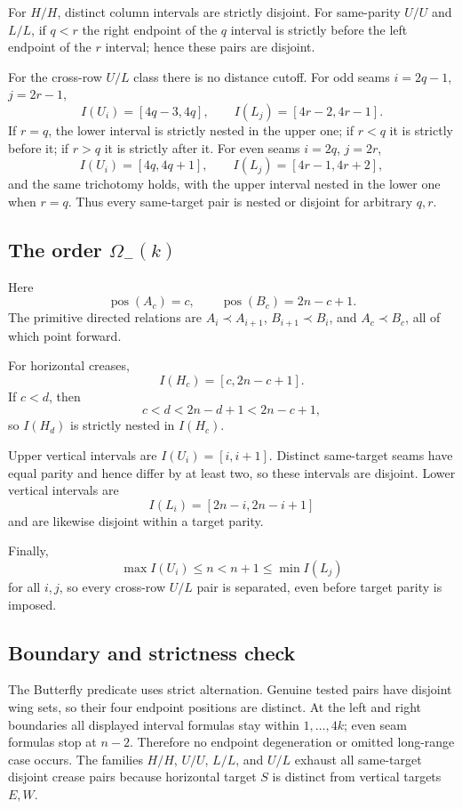 \documentclass[11pt]{article}
\theoremstyle{definition}
\theoremstyle{remark}
\begin{document}
For \(H/H\), distinct column intervals are strictly disjoint. For
same-parity \(U/U\) and \(L/L\), if \(q<r\) the right endpoint of the
\(q\) interval is strictly before the left endpoint of the \(r\)
interval; hence these pairs are disjoint.

For the cross-row \(U/L\) class there is no distance cutoff. For odd
seams \(i=2q-1\), \(j=2r-1\), \[
I(U_i)=[4q-3,4q],\qquad I(L_j)=[4r-2,4r-1].
\] If \(r=q\), the lower interval is strictly nested in the upper one;
if \(r<q\) it is strictly before it; if \(r>q\) it is strictly after it.
For even seams \(i=2q\), \(j=2r\), \[
I(U_i)=[4q,4q+1],\qquad I(L_j)=[4r-1,4r+2],
\] and the same trichotomy holds, with the upper interval nested in the
lower one when \(r=q\). Thus every same-target pair is nested or
disjoint for arbitrary \(q,r\).

\subsection{\texorpdfstring{The order
\(\Omega_-(k)\)}{The order \textbackslash Omega\_-(k)}}\label{c.2.-the-order-omega_-k}

Here \[
\operatorname{pos}(A_c)=c,\qquad
\operatorname{pos}(B_c)=2n-c+1.
\] The primitive directed relations are \(A_i\prec A_{i+1}\),
\(B_{i+1}\prec B_i\), and \(A_c\prec B_c\), all of which point forward.

For horizontal creases, \[
I(H_c)=[c,2n-c+1].
\] If \(c<d\), then \[
c<d<2n-d+1<2n-c+1,
\] so \(I(H_d)\) is strictly nested in \(I(H_c)\).

Upper vertical intervals are \(I(U_i)=[i,i+1]\). Distinct same-target
seams have equal parity and hence differ by at least two, so these
intervals are disjoint. Lower vertical intervals are \[
I(L_i)=[2n-i,2n-i+1]
\] and are likewise disjoint within a target parity.

Finally, \[
\max I(U_i)\le n<n+1\le\min I(L_j)
\] for all \(i,j\), so every cross-row \(U/L\) pair is separated, even
before target parity is imposed.

\subsection{Boundary and strictness
check}\label{c.3.-boundary-and-strictness-check}

The Butterfly predicate uses strict alternation. Genuine tested pairs
have disjoint wing sets, so their four endpoint positions are distinct.
At the left and right boundaries all displayed interval formulas stay
within \(1,\ldots,4k\); even seam formulas stop at \(n-2\). Therefore no
endpoint degeneration or omitted long-range case occurs. The families
\(H/H\), \(U/U\), \(L/L\), and \(U/L\) exhaust all same-target disjoint
crease pairs because horizontal target \(S\) is distinct from vertical
targets \(E,W\).
\end{document}
